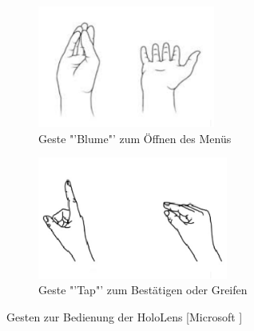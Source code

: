 \documentclass[11pt, titlepage, fleqn]{report}
\begin{document}
                    \begin{figure}[htbp]
                        \begin{subfigure}{0.5\textwidth}
                        	\includegraphics[height=4cm]{./img/Gesture1.png}
                        	\caption{Geste "'Blume"' zum Öffnen des Menüs}
                        \end{subfigure}
                    	\begin{subfigure}{0.5\textwidth}
                        	\includegraphics[height=4cm]{./img/Gesture2.png}
                        	\caption{Geste "'Tap"' zum Bestätigen oder Greifen}
                        \end{subfigure}
                        \caption[Gesten zur Bedienung der HoloLens]{Gesten zur Bedienung der HoloLens [Microsoft \cite{Gesture}]
                        \label{fig:Gestures}}
                    \end{figure}
\end{document}
